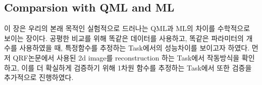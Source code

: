 %
%
\subsection{Comparsion with QML and ML} \label{qml:comparision}

이 장은 우리의 본래 목적인 실험적으로 드러나는 QML과 ML의 차이를 수학적으로 보이는 장이다. 공평한 비교를 위해 똑같은 데이터를 사용하고, 똑같은 파라미터의 개수를 사용하였을 때, 특정함수를 추정하는 Task에서의 성능차이를 보이고자 하였다. 먼저 QRF논문에서 사용된 2d image를 reconstruction 하는 Task에서 작동방식을 확인하고, 이를 더 확실하게 검증하기 위해 1차원 함수를 추정하는 Task에서 또한 검증을 추가적으로 진행하였다.
